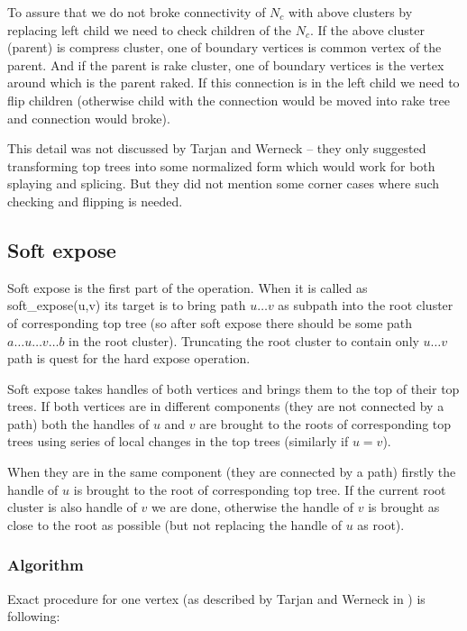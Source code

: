 To assure that we do not broke connectivity of $N_c$ with above clusters by
replacing left child we need to check children of the $N_c$. If the above
cluster (parent) is compress cluster, one of boundary vertices is common vertex
of the parent. And if the parent is rake cluster, one of boundary vertices is
the vertex around which is the parent raked. If this connection is in the left
child we need to flip children (otherwise child with the connection would be
moved into rake tree and connection would broke).

This detail was not discussed by Tarjan and Werneck -- they only suggested
transforming top trees into some normalized form which would work for both
splaying and splicing. But they did not mention some corner cases where such
checking and flipping is needed.

\subsection{Soft expose}

Soft expose is the first part of the \Expose{} operation. When it is called as
{\I soft\_expose(u,v)} its target is to bring path $u\dots v$ as subpath into
the root cluster of corresponding top tree (so after soft expose there should
be some path $a\dots u\dots v\dots b$ in the root cluster). Truncating the root
cluster to contain only $u\dots v$ path is quest for the hard expose operation.

Soft expose takes handles of both vertices and brings them to the top of their
top trees. If both vertices are in different components (they are not connected
by a path) both the handles of $u$ and $v$ are brought to the roots of
corresponding top trees using series of local changes in the top trees
(similarly if $u=v$).

When they are in the same component (they are connected by a path) firstly the
handle of $u$ is brought to the root of corresponding top tree. If the current
root cluster is also handle of $v$ we are done, otherwise the handle of $v$ is
brought as close to the root as possible (but not replacing the handle of $u$ as
root).

\subsubsection{Algorithm}

Exact procedure for one vertex (as described by Tarjan and Werneck in
\cite{SelfAdjustingTT}) is following:

